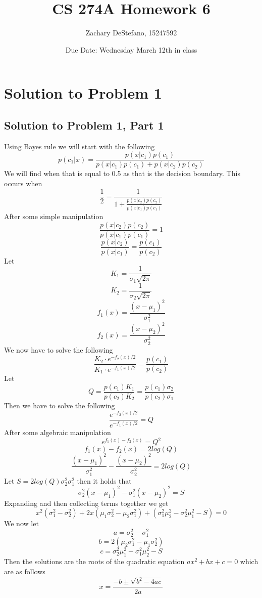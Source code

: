 \documentclass[11pt,psfig]{article}
\begin{document}
\setlength{\parskip}{1.2ex plus0.3ex minus 0.3ex}


\thispagestyle{empty} \pagestyle{myheadings} 



\title{CS 274A Homework 6}
\author{Zachary DeStefano, 15247592}
\date{Due Date: Wednesday March 12th in class}

\maketitle

\vfill\eject

\section*{Solution to Problem 1}

\subsection*{Solution to Problem 1, Part 1}

Using Bayes rule we will start with the following
\[
p(c_1|x) = \frac{p(x|c_1)p(c_1)}{p(x|c_1)p(c_1) + p(x|c_2)p(c_2)}
\]
We will find when that is equal to 0.5 as that is the decision boundary. This occurs when
\[
\frac{1}{2} = \frac{1}{1 + \frac{p(x|c_2)p(c_2)}{p(x|c_1)p(c_1)}}
\]
After some simple manipulation
\[
\frac{p(x|c_2)p(c_2)}{p(x|c_1)p(c_1)} = 1
\]
\[
\frac{p(x|c_2)}{p(x|c_1)} = \frac{p(c_1)}{p(c_2)}
\]
Let
\[
K_1 = \frac{1}{\sigma_1 \sqrt{2\pi}}
\]
\[
K_2 = \frac{1}{\sigma_2 \sqrt{2\pi}}
\]
\[
f_1(x) = \frac{(x-\mu_1)^2}{\sigma_1^2}
\]
\[
f_2(x) = \frac{(x-\mu_2)^2}{\sigma_2^2}
\]
We now have to solve the following
\[
\frac{K_2 \cdot e^{-f_2(x)/2}}{K_1 \cdot e^{-f_1(x)/2}} = \frac{p(c_1)}{p(c_2)}
\]
Let
\[
Q = \frac{p(c_1)K_1}{p(c_2)K_2} = \frac{p(c_1)\sigma_2}{p(c_2)\sigma_1}
\]
Then we have to solve the following
\[
\frac{e^{-f_2(x)/2}}{e^{-f_1(x)/2}} = Q
\]
After some algebraic manipulation
\[
e^{f_1(x) - f_2(x)} = Q^2
\]
\[
f_1(x) - f_2(x) = 2 log(Q)
\]
\[
\frac{(x-\mu_1)^2}{\sigma_1^2} - \frac{(x-\mu_2)^2}{\sigma_2^2} = 2 log(Q)
\]
Let $S = 2 log(Q) \sigma_2^2 \sigma_1^2$ then it holds that
\[
\sigma_2^2(x-\mu_1)^2 - \sigma_1^2(x-\mu_2)^2 = S
\]
Expanding and then collecting terms together we get
\[
x^2(\sigma_1^2 - \sigma_2^2) + 2x(\mu_1 \sigma_2^2 - \mu_2 \sigma_1^2) + (\sigma_1^2 \mu_2^2 - \sigma_2^2 \mu_1^2 - S) = 0
\]
We now let
\[
a = \sigma_2^2 - \sigma_1^2
\]
\[
b = 2(\mu_2 \sigma_1^2 - \mu_1 \sigma_2^2)
\]
\[
c = \sigma_2^2 \mu_1^2 - \sigma_1^2 \mu_2^2 - S
\]
Then the solutions are the roots of the quadratic equation $ax^2 + bx + c = 0$ which are as follows
\[
x = \frac{-b \pm \sqrt{b^2 - 4ac}}{2a}
\]
\end{document}
